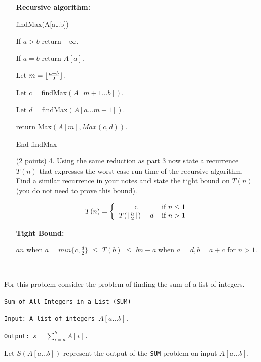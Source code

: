 \documentclass[paper=a4, fontsize=11pt]{scrartcl}
\DeclarePairedDelimiter\floor{\lfloor}{\rfloor}
\numberwithin{equation}{section}		%
\numberwithin{figure}{section}			%
\numberwithin{table}{section}				%
\begin{document}
\begin{enumerate}
\textbf{Recursive algorithm:}

findMax(A[a\dots b])

\hspace{5ex} If $a>b$ return $-\infty$.

\hspace{5ex} If $a=b$ return $A[a]$.

\hspace{5ex} Let $m=\floor{\frac{a+b}{2}}$.

\hspace{5ex} Let $c=$findMax$(A[m+1...b])$.

\hspace{5ex} Let $d=$findMax$(A[a...m-1])$.

\hspace{5ex} return Max$(A[m], Max(c,d))$.

End findMax




\item [(2 points) 4.] Using the same reduction as part 3 now state a recurrence $T(n)$ that expresses the worst case run time of the recursive algorithm.  Find a similar recurrence in your notes and state the tight bound on $T(n)$ (you do not need to prove this bound).

\[
T(n) = \left\{
\begin{tabular}{cc}
c & if $n \leq 1$ \\
$T(\floor{\frac{n}{2}}) + d$ & if $n > 1$
\end{tabular}\right.
\]

\textbf{Tight Bound:}

$an$ when $a=min\{c,\frac{d}{2}\}$ $\leq$ $T(b)$ $\leq$ $bn-a$ when $a=d, b=a+c$ for $n>1$.

\

\end{enumerate}

For this problem consider the problem of finding the sum of a list of integers.

\vspace{12pt}

\noindent\texttt{Sum of All Integers in a List (SUM)}

\texttt{Input: A list of integers $A[a...b]$.}

\texttt{Output: $s = \sum_{i =a}^{b}A[i]$.}
\vspace{12pt}

\noindent Let $S(A[a...b])$ represent the output of the \texttt{SUM} problem on input $A[a...b]$.  
\end{document}
